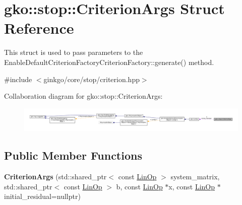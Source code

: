 \hypertarget{structgko_1_1stop_1_1CriterionArgs}{}\section{gko\+:\+:stop\+:\+:Criterion\+Args Struct Reference}
\label{structgko_1_1stop_1_1CriterionArgs}


This struct is used to pass parameters to the Enable\+Default\+Criterion\+Factory\+Criterion\+Factory\+::generate() method.  




{\ttfamily \#include $<$ginkgo/core/stop/criterion.\+hpp$>$}



Collaboration diagram for gko\+:\+:stop\+:\+:Criterion\+Args\+:
\nopagebreak
\begin{figure}[H]
\begin{center}
\leavevmode
\includegraphics[width=350pt]{structgko_1_1stop_1_1CriterionArgs__coll__graph}
\end{center}
\end{figure}
\subsection*{Public Member Functions}
\begin{DoxyCompactItemize}
\item 
\mbox{\label{structgko_1_1stop_1_1CriterionArgs_aee534b8a229d17a5cca30e6fe2dcc05e}} 
{\bfseries Criterion\+Args} (std\+::shared\+\_\+ptr$<$ const \hyperlink{classgko_1_1LinOp}{Lin\+Op} $>$ system\+\_\+matrix, std\+::shared\+\_\+ptr$<$ const \hyperlink{classgko_1_1LinOp}{Lin\+Op} $>$ b, const \hyperlink{classgko_1_1LinOp}{Lin\+Op} $\ast$x, const \hyperlink{classgko_1_1LinOp}{Lin\+Op} $\ast$initial\+\_\+residual=nullptr)
\end{DoxyCompactItemize}
